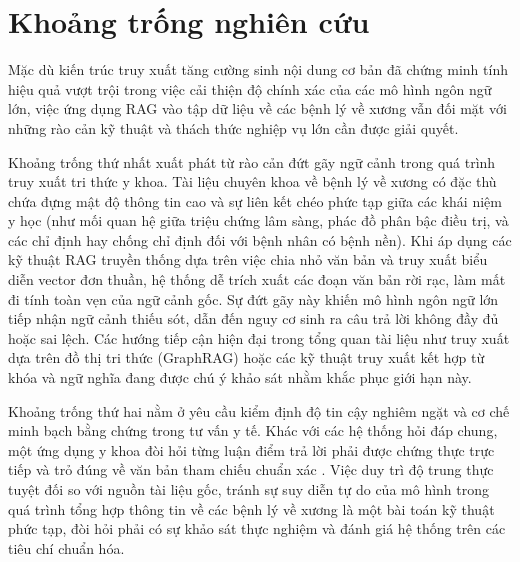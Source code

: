 \section{Khoảng trống nghiên cứu}

Mặc dù kiến trúc truy xuất tăng cường sinh nội dung cơ bản đã chứng minh tính hiệu quả vượt trội trong việc cải thiện độ chính xác của các mô hình ngôn ngữ lớn, việc ứng dụng RAG vào tập dữ liệu về các bệnh lý về xương vẫn đối mặt với những rào cản kỹ thuật và thách thức nghiệp vụ lớn cần được giải quyết.

Khoảng trống thứ nhất xuất phát từ rào cản đứt gãy ngữ cảnh trong quá trình truy xuất tri thức y khoa. Tài liệu chuyên khoa về bệnh lý về xương có đặc thù chứa đựng mật độ thông tin cao và sự liên kết chéo phức tạp giữa các khái niệm y học (như mối quan hệ giữa triệu chứng lâm sàng, phác đồ phân bậc điều trị, và các chỉ định hay chống chỉ định đối với bệnh nhân có bệnh nền). Khi áp dụng các kỹ thuật RAG truyền thống dựa trên việc chia nhỏ văn bản và truy xuất biểu diễn vector đơn thuần, hệ thống dễ trích xuất các đoạn văn bản rời rạc, làm mất đi tính toàn vẹn của ngữ cảnh gốc. Sự đứt gãy này khiến mô hình ngôn ngữ lớn tiếp nhận ngữ cảnh thiếu sót, dẫn đến nguy cơ sinh ra câu trả lời không đầy đủ hoặc sai lệch. Các hướng tiếp cận hiện đại trong tổng quan tài liệu như truy xuất dựa trên đồ thị tri thức (GraphRAG) \cite{microsoft2024} hoặc các kỹ thuật truy xuất kết hợp từ khóa và ngữ nghĩa đang được chú ý khảo sát nhằm khắc phục giới hạn này.

Khoảng trống thứ hai nằm ở yêu cầu kiểm định độ tin cậy nghiêm ngặt và cơ chế minh bạch bằng chứng trong tư vấn y tế. Khác với các hệ thống hỏi đáp chung, một ứng dụng y khoa đòi hỏi từng luận điểm trả lời phải được chứng thực trực tiếp và trỏ đúng về văn bản tham chiếu chuẩn xác \cite{medtrustrag, imedrag}. Việc duy trì độ trung thực tuyệt đối so với nguồn tài liệu gốc, tránh sự suy diễn tự do của mô hình trong quá trình tổng hợp thông tin về các bệnh lý về xương là một bài toán kỹ thuật phức tạp, đòi hỏi phải có sự khảo sát thực nghiệm và đánh giá hệ thống trên các tiêu chí chuẩn hóa.
